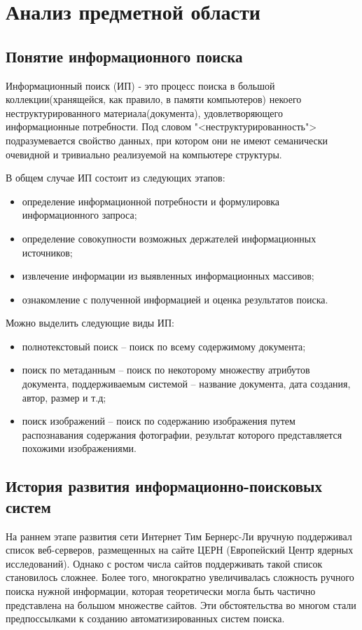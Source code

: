 \newsection
\section{Анализ предметной области}
\subsection{Понятие информационного поиска}

Информационный поиск (ИП) - это процесс поиска в большой коллекции(хранящейся, как правило, в памяти компьютеров) некоего неструктурированного материала(документа), удовлетворяющего информационные потребности. Под словом "<неструктурированность"> подразумевается свойство данных, при котором они не имеют семанически очевидной и тривиально реализуемой на компьютере структуры.

В общем случае ИП состоит из следующих этапов:
\begin{itemize}
\item определение информационной потребности и формулировка информационного запроса;
\item определение совокупности возможных держателей информационных источников;
\item извлечение информации из выявленных информационных массивов;
\item ознакомление с полученной информацией и оценка результатов поиска.
\end{itemize}

Можно выделить следующие виды ИП:
\begin{itemize}
\item полнотекстовый поиск -- поиск по всему содержимому документа;
\item поиск по метаданным -- поиск по некоторому множеству атрибутов документа, поддерживаемым системой -- название документа, дата создания, автор, размер и т.д;
\item поиск изображений -- поиск по содержанию изображения путем распознавания содержания фотографии, результат которого представляется похожими изображениями.
\end{itemize}
 
\subsection{История развития информационно-поисковых систем}
На раннем этапе развития сети Интернет Тим Бернерс-Ли вручную поддерживал список веб-серверов, размещенных на сайте ЦЕРН (Европейский Центр ядерных исследований). Однако с ростом числа сайтов поддерживать такой список становилось сложнее. Более того, многократно увеличивалась сложность ручного поиска нужной информации, которая теоретически могла быть частично представлена на большом множестве сайтов. Эти обстоятельства во многом стали предпоссылками к созданию автоматизированных систем поиска.

